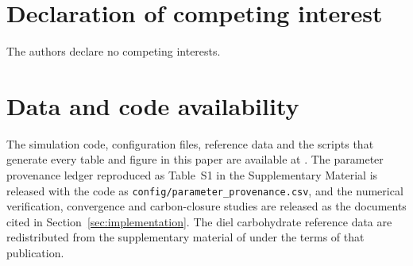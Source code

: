 \documentclass[a4paper,fleqn]{cas-sc}
\begin{document}
\maketitle







\section*{Declaration of competing interest}
The authors declare no competing interests.

\section*{Data and code availability}
The simulation code, configuration files, reference data and the scripts that
generate every table and figure in this paper are available at \FILLINrepo. The
parameter provenance ledger reproduced as Table~S1 in the Supplementary Material
is released with the code as \texttt{config/parameter\_provenance.csv}, and the numerical
verification, convergence and carbon-closure studies are released as the
documents cited in Section~\ref{sec:implementation}. The diel carbohydrate
reference data are redistributed from the supplementary material of
\citet{Sulpice2014} under the terms of that publication.




\makeatletter
{}
\makeatother
\end{document}
